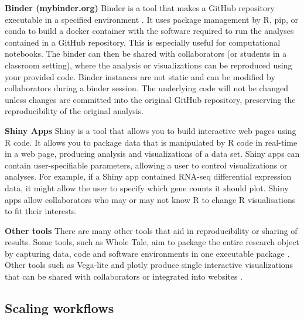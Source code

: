 \documentclass[10pt,letterpaper]{article}
\begin{document}
\begin{greybox}{
 \textbf{Binder (mybinder.org)} Binder is a tool that makes a GitHub repository executable in a specified environment \cite{Jupyter2018}. 
It uses package management by R, pip, or conda to build a docker container with the software required to run the analyses contained in a GitHub repository. 
This is especially useful for computational notebooks. 
The binder can then be shared with collaborators (or students in a classroom setting), where the analysis or visualizations can be reproduced using your provided code. 
Binder instances are not static and can be modified by collaborators during a binder session. 
The underlying code will not be changed unless changes are committed into the original GitHub repository, preserving the reproducibility of the original analysis.
 
 \textbf{Shiny Apps} Shiny is a tool that allows you to build interactive web pages using R code. 
It allows you to package data that is manipulated  by R code in real-time in a web page, producing analysis and visualizations of a data set. 
Shiny apps can contain user-specifiable parameters, allowing a user to control visualizations or analyses. 
For example, if a Shiny app contained RNA-seq differential expression data, it might allow the user to specify which gene counts it should plot. 
Shiny apps allow collaborators who may or may not know R to change R visualisations to fit their interests.   
 
 \textbf{Other tools} There are many other tools that aid in reproducibility or sharing of results. 
Some tools, such as Whole Tale, aim to package the entire research object by capturing data, code and software environments in one executable package \cite{brinckman2019computing}. 
Other tools such as Vega-lite and plotly produce single interactive visualizations that can be shared with collaborators or integrated into websites \cite{satyanarayan2016vega, sievert2017plotly}.
}
\end{greybox}

\subsection*{Scaling workflows} %
\end{document}
